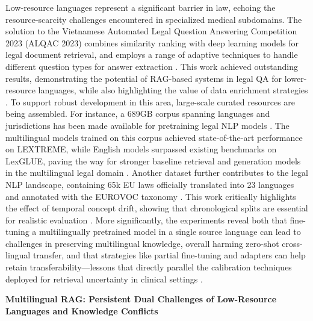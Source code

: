 \documentclass[11pt]{article}
\begin{document}
Low-resource languages represent a significant barrier in law, echoing the resource-scarcity challenges encountered in specialized medical subdomains. The solution to the Vietnamese Automated Legal Question Answering Competition 2023 (ALQAC 2023) combines similarity ranking with deep learning models for legal document retrieval, and employs a range of adaptive techniques to handle different question types for answer extraction \cite{ref184}. This work achieved outstanding results, demonstrating the potential of RAG-based systems in legal QA for lower-resource languages, while also highlighting the value of data enrichment strategies \cite{ref184}. To support robust development in this area, large-scale curated resources are being assembled. For instance, a 689GB corpus spanning languages and jurisdictions has been made available for pretraining legal NLP models \cite{ref185}. The multilingual models trained on this corpus achieved state-of-the-art performance on LEXTREME, while English models surpassed existing benchmarks on LexGLUE, paving the way for stronger baseline retrieval and generation models in the multilingual legal domain \cite{ref185}. Another dataset further contributes to the legal NLP landscape, containing 65k EU laws officially translated into 23 languages and annotated with the EUROVOC taxonomy \cite{ref186}. This work critically highlights the effect of temporal concept drift, showing that chronological splits are essential for realistic evaluation \cite{ref186}. More significantly, the experiments reveal both that fine-tuning a multilingually pretrained model in a single source language can lead to challenges in preserving multilingual knowledge, overall harming zero-shot cross-lingual transfer, and that strategies like partial fine-tuning and adapters can help retain transferability---lessons that directly parallel the calibration techniques deployed for retrieval uncertainty in clinical settings \cite{ref186}.

\textbf{Multilingual RAG: Persistent Dual Challenges of Low-Resource Languages and Knowledge Conflicts}
\end{document}
